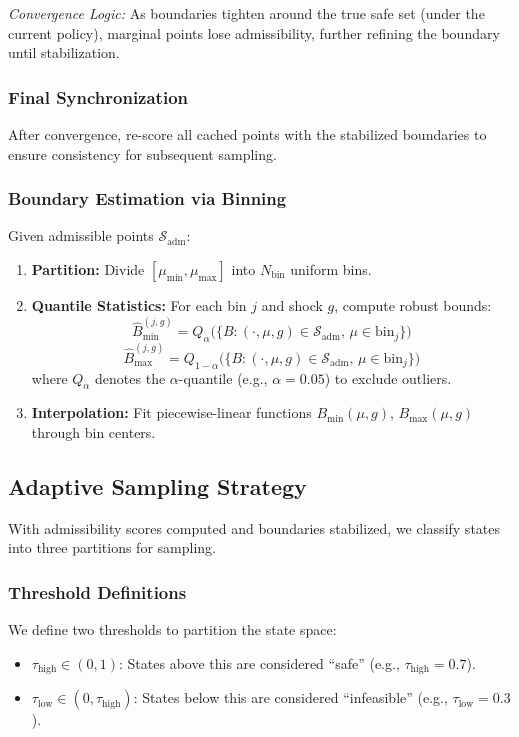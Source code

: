 \textit{Convergence Logic:} As boundaries tighten around the true safe set (under the current policy), marginal points lose admissibility, further refining the boundary until stabilization.

\subsubsection{Final Synchronization}
After convergence, re-score all cached points with the stabilized boundaries to ensure consistency for subsequent sampling.

\subsubsection{Boundary Estimation via Binning}
Given admissible points $\mathcal{S}_{\text{adm}}$:
\begin{enumerate}
    \item \textbf{Partition:} Divide $[\mu_{\min}, \mu_{\max}]$ into $N_{\text{bin}}$ uniform bins.
    \item \textbf{Quantile Statistics:} For each bin $j$ and shock $g$, compute robust bounds:
    \begin{equation}
        \hat{B}_{\min}^{(j,g)} = Q_\alpha\bigl(\{B : (\cdot, \mu, g) \in \mathcal{S}_{\text{adm}},\, \mu \in \text{bin}_j\}\bigr)
    \end{equation}
    \begin{equation}
        \hat{B}_{\max}^{(j,g)} = Q_{1-\alpha}\bigl(\{B : (\cdot, \mu, g) \in \mathcal{S}_{\text{adm}},\, \mu \in \text{bin}_j\}\bigr)
    \end{equation}
    where $Q_\alpha$ denotes the $\alpha$-quantile (e.g., $\alpha = 0.05$) to exclude outliers.
    \item \textbf{Interpolation:} Fit piecewise-linear functions $B_{\min}(\mu, g)$, $B_{\max}(\mu, g)$ through bin centers.
\end{enumerate}


\subsection{Adaptive Sampling Strategy}\label{sec:sampling}

With admissibility scores computed and boundaries stabilized, we classify states into three partitions for sampling.

\subsubsection{Threshold Definitions}
We define two thresholds to partition the state space:
\begin{itemize}
    \item $\tau_{\text{high}} \in (0,1)$: States above this are considered ``safe'' (e.g., $\tau_{\text{high}} = 0.7$).
    \item $\tau_{\text{low}} \in (0, \tau_{\text{high}})$: States below this are considered ``infeasible'' (e.g., $\tau_{\text{low}} = 0.3$).
\end{itemize}


